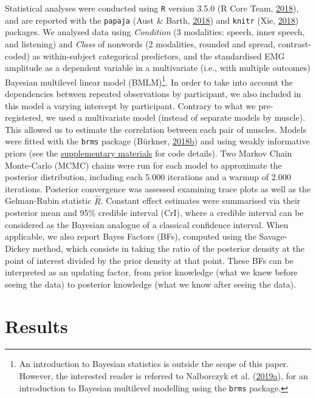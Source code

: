 \documentclass[a4paper,12pt,twoside,onecolumn,openright,final,oldfontcommands]{memoir}
\let\rmarkdownfootnote\footnote%
\def\footnote{\protect\rmarkdownfootnote}
\begin{document}
Statistical analyses were conducted using \texttt{R} version 3.5.0 (R Core Team, \protect\hyperlink{ref-R-base}{2018}), and are reported with the \texttt{papaja} (Aust \& Barth, \protect\hyperlink{ref-R-papaja}{2018}) and \texttt{knitr} (Xie, \protect\hyperlink{ref-R-knitr}{2018}) packages. We analysed data using \emph{Condition} (3 modalities: speech, inner speech, and listening) and \emph{Class} of nonwords (2 modalities, rounded and spread, contrast-coded) as within-subject categorical predictors, and the standardised EMG amplitude as a dependent variable in a multivariate (i.e., with multiple outcomes) Bayesian multilevel linear model (BMLM)\footnote{An introduction to Bayesian statistics is outside the scope of this paper. However, the interested reader is referred to Nalborczyk et al. (\protect\hyperlink{ref-nalborczyk_introduction_2019}{2019}\protect\hyperlink{ref-nalborczyk_introduction_2019}{a}), for an introduction to Bayesian multilevel modelling using the \texttt{brms} package.}. In order to take into account the dependencies between repeated observations by participant, we also included in this model a varying intercept by participant. Contrary to what we pre-registered, we used a multivariate model (instead of separate models by muscle). This allowed us to estimate the correlation between each pair of muscles. Models were fitted with the \texttt{brms} package (Bürkner, \protect\hyperlink{ref-R-brms}{2018}\protect\hyperlink{ref-R-brms}{b}) and using weakly informative priors (see the \protect\hyperlink{suppCh5}{supplementary materials} for code details). Two Markov Chain Monte-Carlo (MCMC) chains were run for each model to approximate the posterior distribution, including each 5.000 iterations and a warmup of 2.000 iterations. Posterior convergence was assessed examining trace plots as well as the Gelman-Rubin statistic \(\hat{R}\). Constant effect estimates were summarised via their posterior mean and 95\% credible interval (CrI), where a credible interval can be considered as the Bayesian analogue of a classical confidence interval. When applicable, we also report Bayes Factors (BFs), computed using the Savage-Dickey method, which consists in taking the ratio of the posterior density at the point of interest divided by the prior density at that point. These BFs can be interpreted as an updating factor, from prior knowledge (what we knew before seeing the data) to posterior knowledge (what we know after seeing the data).

\hypertarget{results-2}{%
\section{Results}\label{results-2}}
\end{document}
